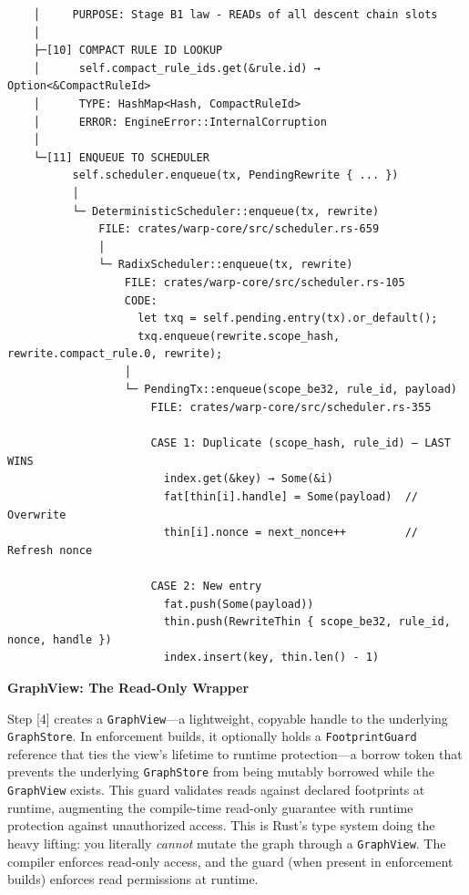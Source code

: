 \documentclass[11pt]{book}
\begin{document}
\begin{verbatim}
    │     PURPOSE: Stage B1 law - READs of all descent chain slots
    │
    ├─[10] COMPACT RULE ID LOOKUP
    │      self.compact_rule_ids.get(&rule.id) → Option<&CompactRuleId>
    │      TYPE: HashMap<Hash, CompactRuleId>
    │      ERROR: EngineError::InternalCorruption
    │
    └─[11] ENQUEUE TO SCHEDULER
          self.scheduler.enqueue(tx, PendingRewrite { ... })
          │
          └─ DeterministicScheduler::enqueue(tx, rewrite)
              FILE: crates/warp-core/src/scheduler.rs-659
              │
              └─ RadixScheduler::enqueue(tx, rewrite)
                  FILE: crates/warp-core/src/scheduler.rs-105
                  CODE:
                    let txq = self.pending.entry(tx).or_default();
                    txq.enqueue(rewrite.scope_hash, rewrite.compact_rule.0, rewrite);
                  │
                  └─ PendingTx::enqueue(scope_be32, rule_id, payload)
                      FILE: crates/warp-core/src/scheduler.rs-355

                      CASE 1: Duplicate (scope_hash, rule_id) — LAST WINS
                        index.get(&key) → Some(&i)
                        fat[thin[i].handle] = Some(payload)  // Overwrite
                        thin[i].nonce = next_nonce++         // Refresh nonce

                      CASE 2: New entry
                        fat.push(Some(payload))
                        thin.push(RewriteThin { scope_be32, rule_id, nonce, handle })
                        index.insert(key, thin.len() - 1)
\end{verbatim}

\begin{cleverpattern}
\textbf{GraphView: The Read-Only Wrapper}

Step [4] creates a \texttt{GraphView}---a lightweight, copyable handle to the underlying \texttt{GraphStore}. In enforcement builds, it optionally holds a \texttt{FootprintGuard} reference that ties the view's lifetime to runtime protection---a borrow token that prevents the underlying \texttt{GraphStore} from being mutably borrowed while the \texttt{GraphView} exists. This guard validates reads against declared footprints at runtime, augmenting the compile-time read-only guarantee with runtime protection against unauthorized access. This is Rust's type system doing the heavy lifting: you literally \emph{cannot} mutate the graph through a \texttt{GraphView}. The compiler enforces read-only access, and the guard (when present in enforcement builds) enforces read permissions at runtime.
\end{cleverpattern}
\end{document}
